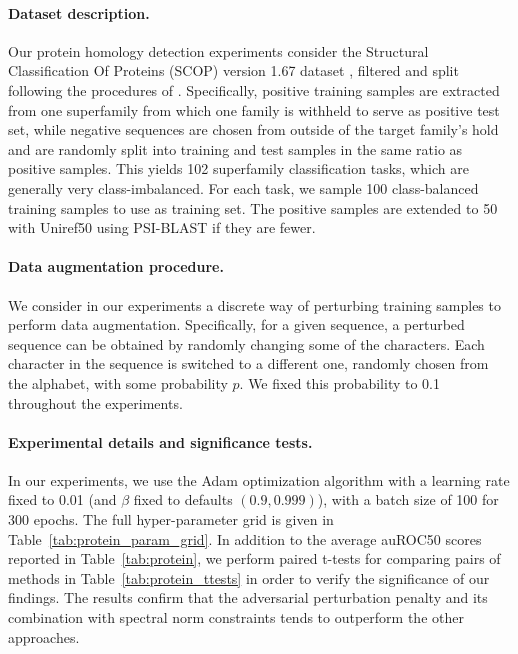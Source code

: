 \paragraph{Dataset description.}
Our protein homology detection experiments consider
the Structural Classification Of Proteins (SCOP) version 1.67 dataset \citep{murzin1995scop},
filtered and split following the procedures of \cite{haandstad2007motif}.
Specifically, positive training samples are extracted from one superfamily from which one family is withheld to serve as positive test set, while negative sequences are chosen from outside of the target family’s hold and are randomly split into training and test samples in the same ratio as positive samples.
This yields 102 superfamily classification tasks, which are generally very class-imbalanced.
For each task, we sample 100 class-balanced training samples to use as training set. The positive samples are extended to 50 with Uniref50 using PSI-BLAST \citep{altschul1997gapped} if they are fewer.

\paragraph{Data augmentation procedure.}
We consider in our experiments a discrete way of perturbing training samples to 
perform data augmentation. Specifically, for a given sequence, a perturbed sequence 
can be obtained by randomly changing some of the characters. Each character in the sequence 
is switched to a different one, randomly chosen from the alphabet, with some 
probability $p$. We fixed this probability to 0.1 throughout the experiments.

\paragraph{Experimental details and significance tests.}
In our experiments, we use the Adam optimization algorithm with a learning rate fixed
to 0.01 (and $\beta$ fixed to defaults $(0.9, 0.999)$),
with a batch size of 100 for 300 epochs.
The full hyper-parameter grid is given in Table~\ref{tab:protein_param_grid}.
In addition to the average auROC50 scores reported in Table~\ref{tab:protein},
we perform paired t-tests for comparing pairs of methods in Table~\ref{tab:protein_ttests}
in order to verify the significance of our findings.
The results confirm that the adversarial perturbation penalty and its combination
with spectral norm constraints tends to outperform the other approaches.


